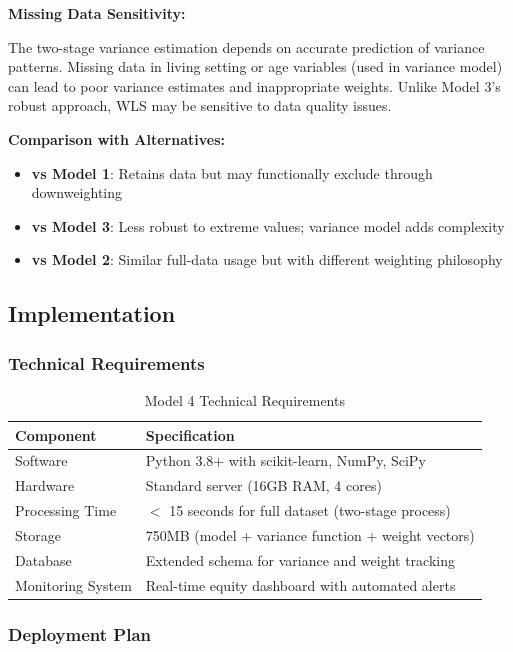 \textbf{Missing Data Sensitivity:}

The two-stage variance estimation depends on accurate prediction of variance patterns. Missing data in living setting or age variables (used in variance model) can lead to poor variance estimates and inappropriate weights. Unlike Model 3's robust approach, WLS may be sensitive to data quality issues.

\textbf{Comparison with Alternatives:}
\begin{itemize}
    \item \textbf{vs Model 1}: Retains data but may functionally exclude through downweighting
    \item \textbf{vs Model 3}: Less robust to extreme values; variance model adds complexity
    \item \textbf{vs Model 2}: Similar full-data usage but with different weighting philosophy
\end{itemize}

\subsection{Implementation}

\subsubsection{Technical Requirements}

\begin{table}[h]
\centering
\caption{Model 4 Technical Requirements}
\begin{tabular}{ll}
\toprule
\textbf{Component} & \textbf{Specification} \\
\midrule
Software & Python 3.8+ with scikit-learn, NumPy, SciPy \\
Hardware & Standard server (16GB RAM, 4 cores) \\
Processing Time & $<$ 15 seconds for full dataset (two-stage process) \\
Storage & 750MB (model + variance function + weight vectors) \\
Database & Extended schema for variance and weight tracking \\
Monitoring System & Real-time equity dashboard with automated alerts \\
\bottomrule
\end{tabular}
\end{table}

\subsubsection{Deployment Plan}

